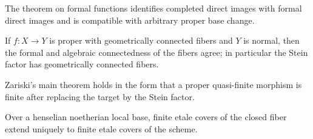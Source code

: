 \begin{corollary}\label{fga-cor-8-2-10}
The theorem on formal functions identifies completed direct images with formal
direct images and is compatible with arbitrary proper base change.
\end{corollary}
\begin{theorem}\label{fga-thm-8-2-12}
If $f:X\to Y$ is proper with geometrically connected fibers and $Y$ is normal,
then the formal and algebraic connectedness of the fibers agree; in particular
the Stein factor has geometrically connected fibers.
\end{theorem}
\begin{corollary}\label{fga-cor-8-2-17}
Zariski's main theorem holds in the form that a proper quasi-finite morphism is
finite after replacing the target by the Stein factor.
\end{corollary}
\begin{corollary}\label{fga-cor-8-2-18}
Over a henselian noetherian local base, finite etale covers of the closed fiber
extend uniquely to finite etale covers of the scheme.
\end{corollary}

